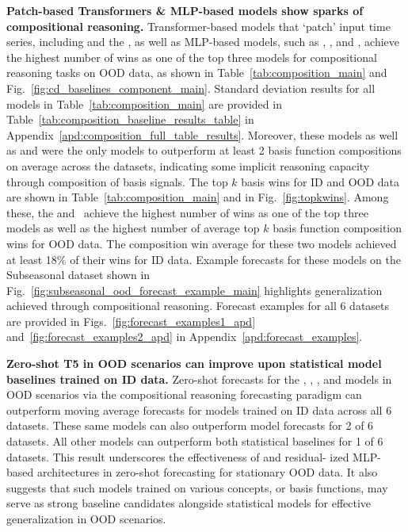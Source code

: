 


\textbf{Patch-based Transformers \& MLP-based models show sparks of compositional reasoning.} Transformer-based models that `patch' input time series, including \PatchTST and the \Tfive, as well as MLP-based models, such as \MLP, \NHITS, and \NBEATS, achieve the highest number of wins as one of the top three models for compositional reasoning tasks on OOD data, as shown in Table~\ref{tab:composition_main} and Fig.~\ref{fig:cd_baselines_component_main}. Standard deviation results for all models in Table~\ref{tab:composition_main} are provided in Table~\ref{tab:composition_baseline_results_table} in Appendix~\ref{apd:composition_full_table_results}. Moreover, these models as well as \TimesNet and \TFT were the only models to outperform at least 2 basis function compositions on average across the datasets, indicating some implicit reasoning capacity through composition of basis signals. The top $k$ basis wins for ID and OOD data are shown in Table~\ref{tab:composition_main} and in Fig.~\ref{fig:topkwins}. Among these, the \Tfive and \NBEATS\ achieve the highest number of wins as one of the top three models as well as the highest number of average top $k$ basis function composition wins for OOD data. The composition win average for these two models achieved at least 18\% of their wins for ID data. Example forecasts for these models on the Subseasonal dataset shown in Fig.~\ref{fig:subseasonal_ood_forecast_example_main} highlights generalization achieved through compositional reasoning. Forecast examples for all 6 datasets are provided in Figs.~\ref{fig:forecast_examples1_apd} and~\ref{fig:forecast_examples2_apd} in Appendix~\ref{apd:forecast_examples}.

\textbf{Zero-shot T5 in OOD scenarios can improve upon statistical model baselines trained on ID data.} Zero-shot forecasts for the \Tfive, \NHITS, \NBEATS, and \MLP models in OOD scenarios via the compositional reasoning forecasting paradigm can outperform moving average forecasts for \ARIMA models trained on ID data across all 6 datasets. These same models can also outperform \ETS model forecasts for 2 of 6 datasets. All other models can outperform both statistical baselines for 1 of 6 datasets. This result underscores the effectiveness of \Tfive and residual-
ized MLP-based architectures in zero-shot forecasting for stationary OOD data. It also suggests that such models trained on various concepts, or basis functions, may serve as strong baseline candidates alongside statistical models for effective generalization in OOD scenarios.

